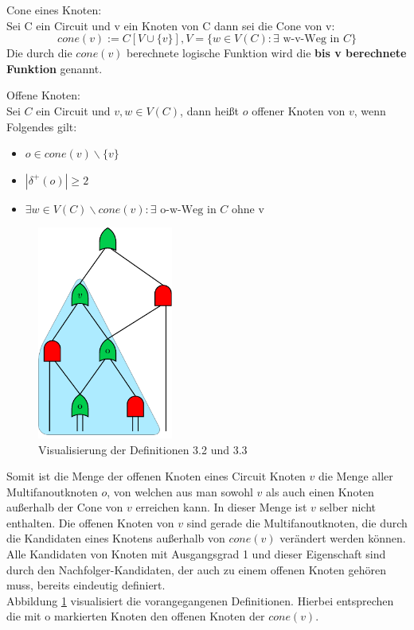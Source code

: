 \documentclass[11pt, a4paper, german]{article}
\begin{document}
\begin{definition}{Cone eines Knoten:}\\
	Sei C ein Circuit und v ein Knoten von C dann sei die Cone von v: 
	\[ cone(v) := C[V \cup \{ v \}], V = \{ w \in V(C) : \exists \text{ w-v-Weg in }  C \} \] 
	Die durch die $cone(v)$ berechnete logische Funktion wird die	{\bf bis v berechnete Funktion} genannt.
\end{definition}

\begin{definition}{Offene Knoten:}\\
	Sei $C$ ein Circuit und $v,w \in V(C)$, dann heißt $o$ offener Knoten von $v$, wenn Folgendes gilt: 
	\begin{itemize}
		\item $ o \in cone(v)\backslash \{ v \} $
		\item $| \delta ^{+}(o)| \geq 2$
		\item $ \exists w \in V(C) \backslash cone(v) : \exists \text{ o-w-Weg in } C \text{ ohne v} $
	\end{itemize}	
\end{definition}
 \begin{figure}
		\includegraphics[height = 7cm]{pictures/compiled/cone}
		\caption{Visualisierung der Definitionen 3.2 und 3.3}
		\label{bild:cone}
\end{figure}
Somit ist die Menge der offenen Knoten eines Circuit Knoten $v$ die Menge aller Multifanoutknoten $o$, von welchen aus man sowohl $v$ als auch einen Knoten außerhalb der Cone von $v$ erreichen kann. In dieser Menge ist $v$ selber nicht enthalten. Die offenen Knoten von $v$ sind gerade die Multifanoutknoten, die durch die Kandidaten eines Knotens außerhalb von $cone(v)$ verändert werden können. Alle Kandidaten von  Knoten mit Ausgangsgrad 1 und dieser Eigenschaft sind durch den Nachfolger-Kandidaten, der auch zu einem offenen Knoten gehören muss, bereits eindeutig definiert. \\
Abbildung \ref{bild:cone} visualisiert die vorangegangenen Definitionen. Hierbei entsprechen die  mit o markierten Knoten den offenen Knoten der $cone(v)$.
\end{document}
